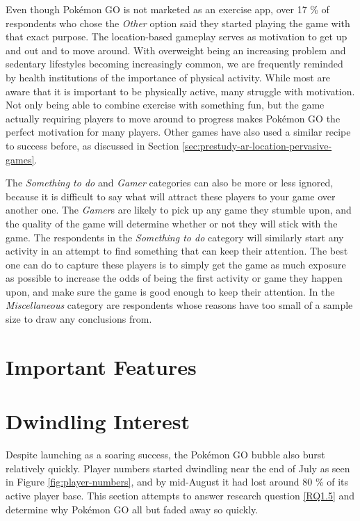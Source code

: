 Even though Pokémon GO is not marketed as an exercise app, over 17 \% of respondents who chose the \emph{Other} option said they started playing the game with that exact purpose. The location-based gameplay serves as motivation to get up and out and to move around. With overweight being an increasing problem and sedentary lifestyles becoming increasingly common, we are frequently reminded by health institutions of the importance of physical activity. While most are aware that it is important to be physically active, many struggle with motivation. Not only being able to combine exercise with something fun, but the game actually requiring players to move around to progress makes Pokémon GO the perfect motivation for many players. Other games have also used a similar recipe to success before, as discussed in Section \ref{sec:prestudy-ar-location-pervasive-games}.

The \emph{Something to do} and \emph{Gamer} categories can also be more or less ignored, because it is difficult  to say what will attract these players to your game over another one. The \emph{Gamer}s are likely to pick up any game they stumble upon, and the quality of the game will determine whether or not they will stick with the game. The respondents in the \emph{Something to do} category will similarly start any activity in an attempt to find something that can keep their attention. The best one can do to capture these players is to simply get the game as much exposure as possible to increase the odds of being the first activity or game they happen upon, and make sure the game is good enough to keep their attention. In the \emph{Miscellaneous} category are respondents whose reasons have too small of a sample size to draw any conclusions from.

\section{Important Features}
\label{sec:success-factors-features}


\section{Dwindling Interest}

Despite launching as a soaring success, the Pokémon GO bubble also burst relatively quickly. Player numbers started dwindling near the end of July as seen in Figure \ref{fig:player-numbers}, and by mid-August it had lost around 80 \%  of its active player base. This section attempts to answer research question \ref{RQ1.5} and determine why Pokémon GO all but faded away so quickly.

